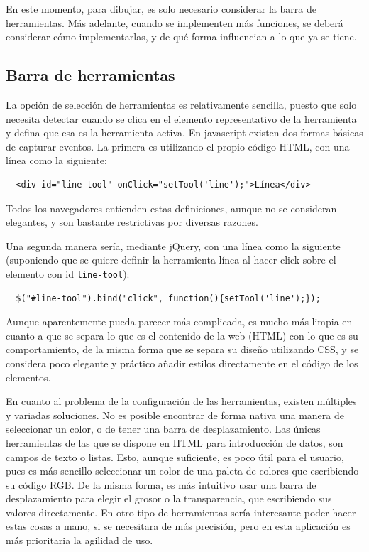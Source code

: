 En este momento, para dibujar, es solo necesario considerar la barra de herramientas. Más adelante, cuando se implementen más funciones, se deberá considerar cómo implementarlas, y de qué forma influencian a lo que ya se tiene.

\subsection{Barra de herramientas} %
\label{sub:barra_de_herramientas}

La opción de selección de herramientas es relativamente sencilla, puesto que solo necesita detectar cuando se clica en el elemento representativo de la herramienta y defina que esa es la herramienta activa. En javascript existen dos formas básicas de capturar eventos. La primera es utilizando el propio código HTML, con una línea como la siguiente:
\begin{verbatim}
  <div id="line-tool" onClick="setTool('line');">Línea</div>
\end{verbatim}
Todos los navegadores entienden estas definiciones, aunque no se consideran elegantes, y son bastante restrictivas por diversas razones.

Una segunda manera sería, mediante jQuery, con una línea como la siguiente (suponiendo que se quiere definir la herramienta línea al hacer click sobre el elemento con id \texttt{line-tool}):
\begin{verbatim}
  $("#line-tool").bind("click", function(){setTool('line');});
\end{verbatim}
Aunque aparentemente pueda parecer más complicada, es mucho más limpia en cuanto a que se separa lo que es el contenido de la web (HTML) con lo que es su comportamiento, de la misma forma que se separa su diseño utilizando CSS, y se considera poco elegante y práctico añadir estilos directamente en el código de los elementos.

En cuanto al problema de la configuración de las herramientas, existen múltiples y variadas soluciones. No es posible encontrar de forma nativa una manera de seleccionar un color, o de tener una barra de desplazamiento. Las únicas herramientas de las que se dispone en HTML para introducción de datos, son campos de texto o listas. Esto, aunque suficiente, es poco útil para el usuario, pues es más sencillo seleccionar un color de una paleta de colores que escribiendo su código RGB. De la misma forma, es más intuitivo usar una barra de desplazamiento para elegir el grosor o la transparencia, que escribiendo sus valores directamente. En otro tipo de herramientas sería interesante poder hacer estas cosas a mano, si se necesitara de más precisión, pero en esta aplicación es más prioritaria la agilidad de uso.

